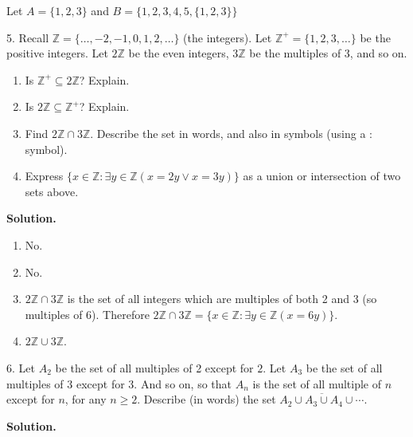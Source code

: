 \documentclass[10pt,]{book}
\theoremstyle{plain}
\theoremstyle{definition}
\theoremstyle{definition}
\theoremstyle{definition}
\numberwithin{equation}{section}
\def\Z{\mathbb Z}
\def\st{:}
\def\bar{\overline}
\begin{document}
\begin{exerciselist}
            Let \(A = \{1,2,3\}\) and \(B = \{1,2,3,4,5,\{1,2,3\}\}\)
\item[5.]\hypertarget{exercise-15}{}
            Recall \(\Z = \{\ldots,-2,-1,0, 1,2,\ldots\}\) (the integers). Let \(\Z^+ = \{1, 2, 3, \ldots\}\) be the positive integers. Let \(2\Z\) be the even integers, \(3\Z\) be the multiples of 3, and so on.
\leavevmode%
\begin{enumerate}[label=(\alph*)]
\item\hypertarget{li-250}{}
                Is \(\Z^+ \subseteq 2\Z\)? Explain.
\item\hypertarget{li-251}{}
                Is \(2\Z \subseteq \Z^+\)? Explain.
\item\hypertarget{li-252}{}
                Find \(2\Z \cap 3\Z\). Describe the set in words, and also in symbols (using a \(\st\) symbol).
\item\hypertarget{li-253}{}
                Express \(\{x \in \Z \st \exists y\in \Z (x = 2y \vee x = 3y)\}\) as a union or intersection of two sets above.
\end{enumerate}
\par\smallskip
\par\smallskip
\noindent\textbf{Solution.}\hypertarget{solution-27}{}\quad
\leavevmode%
\begin{enumerate}[label=(\alph*)]
\item\hypertarget{li-254}{}
                No.
\item\hypertarget{li-255}{}
                No.
\item\hypertarget{li-256}{}\(2\Z \cap 3\Z\) is the set of all integers which are multiples of both 2 and 3 (so multiples of 6). Therefore \(2\Z \cap 3\Z = \{x \in \Z \st \exists y\in \Z(x = 6y)\}\).\item\hypertarget{li-257}{}\(2\Z \cup 3\Z\).\end{enumerate}
\item[6.]\hypertarget{exercise-16}{}
            Let \(A_2\) be the set of all multiples of 2 except for \(2\). Let \(A_3\) be the set of all multiples of 3 except for 3. And so on, so that \(A_n\) is the set of all multiple of \(n\) except for \(n\), for any \(n \ge 2\). Describe (in words) the set \(\bar{A_2 \cup A_3 \cup A_4 \cup \cdots}\).
\par\smallskip
\par\smallskip
\noindent\textbf{Solution.}\hypertarget{solution-28}{}\quad


\end{exerciselist}
\end{document}

